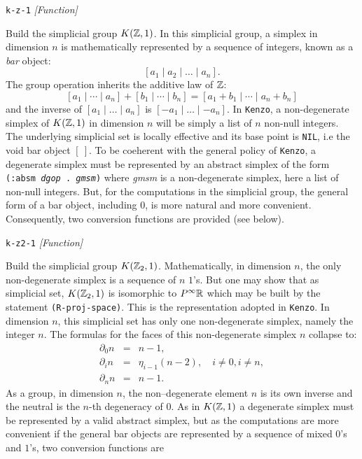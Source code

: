 {\parindent=0mm
{\leftskip=5mm
{\tt k-z-1}  \hfill {\em [Function]} \par}
{\leftskip=15mm
Build the simplicial group $K({\mathbb{Z}},1)$. In this simplicial group, a  simplex  in dimension $n$
is mathematically represented by a sequence of integers, known as a {\em bar} object:
$$ [a_1 \mid a_2 \mid \ldots \mid a_n]. $$
The group operation inherits the additive law of ${\mathbb{Z}}$:
$$[a_1  \mid \cdots \mid a_n] + [b_1 \mid \cdots \mid b_n] = [a_1+b_1 \mid \cdots \mid a_n+b_n]$$
and the inverse of $[a_1  \mid \ldots \mid a_n]$ is $[-a_1 \mid \ldots \mid -a_n]. $
In {\tt Kenzo}, a non-degenerate simplex of $K({\mathbb{Z}},1)$ in dimension $n$ will be simply
a list of $n$ non-null integers.
The underlying simplicial set is locally effective and its base point is {\tt NIL}, i.e the void bar object
$[\ ]$. To be coeherent with the general policy of {\tt Kenzo}, a degenerate simplex must be represented by
an abstract simplex of the form {\tt (:absm {\em dgop} . {\em gmsm})} where {\em gmsm} is a non-degenerate
simplex, here a list of non-null integers. But, for the computations in the simplicial group, the
general form of a bar object, including $0$, is more natural and more convenient. Consequently, two conversion
functions are provided (see below). \par}
{\leftskip=5mm
{\tt k-z2-1}  \hfill {\em [Function]} \par}
{\leftskip=15mm
Build the simplicial group $K({\mathbb{Z}}_2,1)$.
Mathematically, in dimension $n$, the only non-degenerate simplex is
a sequence of $n$ $1$'s. But one may show that as simplicial set, $K({\mathbb{Z}}_2,1)$ is  isomorphic to
$P^\infty {{\mathbb{R}}}$ which may be built by the statement {\tt (R-proj-space)}. This is the representation
adopted in {\tt Kenzo}. In dimension $n$, this
simplicial set has only one non-degenerate simplex, namely the integer $n$. The formulas for the faces of this
non-degenerate simplex $n$ collapse to:
\begin{eqnarray*}
\partial_0 n & = & n-1, \\
\partial_i n & = & \eta_{i-1} (n-2), \quad i \not= 0, i \not=n,  \\
\partial_n n & = & n-1.
\end{eqnarray*}
As a group, in dimension $n$, the non--degenerate element $n$
is its own inverse and the neutral is the $n$-th degeneracy of $0$. As in $K({\mathbb{Z}}, 1)$ a degenerate simplex
must be represented by a valid abstract simplex, but as the computations are more convenient if the
general bar objects are represented by a sequence of mixed $0$'s and $1$'s, two conversion functions are
}}

